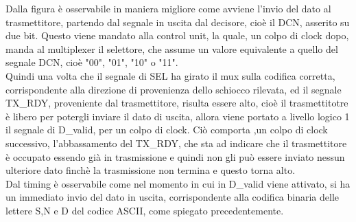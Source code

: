 \documentclass[a4paper, titlepage]{article}
\begin{document}
Dalla figura è osservabile in maniera migliore come avviene l'invio del dato al trasmettitore, partendo dal segnale in uscita dal decisore, cioè il DCN, asserito su due bit. Questo viene mandato alla control unit, la quale, un colpo di clock dopo, manda al multiplexer il selettore, che assume un valore equivalente a quello del segnale DCN, cioè "00", "01", "10" o "11".\\Quindi una volta che il segnale di SEL ha girato il mux sulla codifica corretta, corrispondente alla direzione di provenienza dello schiocco rilevata, ed il segnale TX\_RDY, proveniente dal trasmettitore, risulta essere alto, cioè il trasmettitotre è libero per potergli inviare il dato di uscita, allora viene portato a livello logico 1 il segnale di D\_valid, per un colpo di clock. Ciò comporta ,un colpo di clock successivo, l'abbassamento del TX\_RDY, che sta ad indicare che il trasmettitore è occupato essendo già in trasmissione e quindi non gli può essere inviato nessun ulteriore dato finchè la trasmissione non termina e questo torna alto.\\Dal timing è osservabile come nel momento in cui in D\_valid viene attivato, si ha un immediato invio del dato in uscita, corrispondente alla codifica binaria delle lettere S,N e D del codice ASCII, come spiegato precedentemente.
\end{document}
